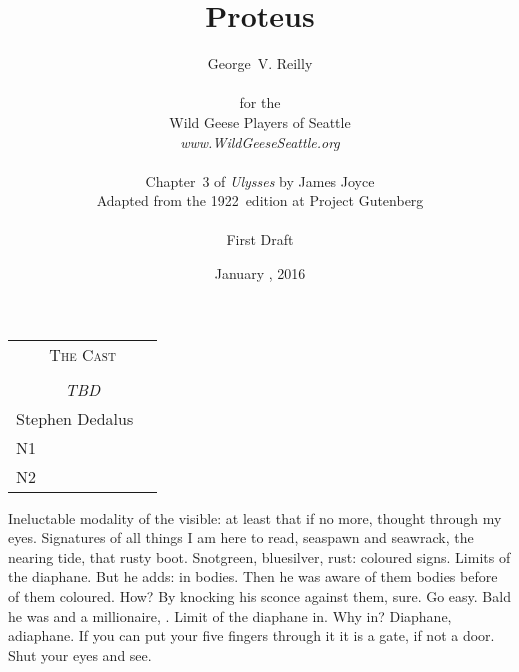 


\title{\Huge Proteus}
\author{George~V. Reilly\\
\\
{\small for the}\\
Wild Geese Players of Seattle\\
{\emph{www.WildGeeseSeattle.org}}\\
\\
{\small Chapter~3 of \emph{Ulysses} by James Joyce}\\
{\small Adapted from the 1922~edition at Project Gutenberg}
\\
\\
{\small First Draft}}
\date{January , 2016}
\raggedbottom



\maketitle
\thispagestyle{empty}
\pagebreak

\begin{tabular}{lp{10cm}}
    \multicolumn{2}{c}{\Large \textsc{The Cast}} \\
\\
    \multicolumn{2}{c}{\large \textit{TBD}} \\
Stephen Dedalus \\
N1 \\
N2 \\
\end{tabular}

\thispagestyle{empty}
\newpage


\setcounter{page}{1}


Ineluctable modality of the visible:
at least that if no more, thought through my eyes.
Signatures of all things I am here to read,
seaspawn and seawrack,
the nearing tide,
that rusty boot.
Snotgreen, bluesilver, rust:
coloured signs.
Limits of the diaphane.
But he adds: in bodies.
Then he was aware of them bodies before of them coloured.
How?
By knocking his sconce against them, sure.
Go easy.
Bald he was and a millionaire,
.
Limit of the diaphane in.
Why in?
Diaphane, adiaphane.
If you can put your five fingers through it it is a gate,
if not a door.
Shut your eyes and see.

